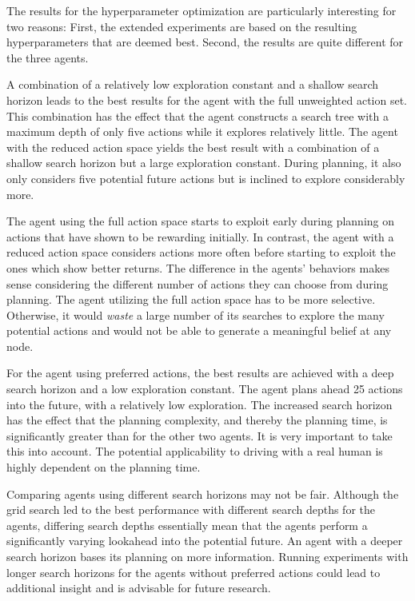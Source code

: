 The results for the hyperparameter optimization are particularly interesting for two reasons: First, the extended experiments are based on the resulting hyperparameters that are deemed best. Second, the results are quite different for the three agents. 

A combination of a relatively low exploration constant and a shallow search horizon leads to the best results for the agent with the full unweighted action set. This combination has the effect that the agent constructs a search tree with a maximum depth of only five actions while it explores relatively little. The agent with the reduced action space yields the best result with a combination of a shallow search horizon but a large exploration constant. During planning, it also only considers five potential future actions but is inclined to explore considerably more. 

The agent using the full action space starts to exploit early during planning on actions that have shown to be rewarding initially. In contrast, the agent with a reduced action space considers actions more often before starting to exploit the ones which show better returns. The difference in the agents' behaviors makes sense considering the different number of actions they can choose from during planning. The agent utilizing the full action space has to be more selective. Otherwise, it would \emph{waste} a large number of its searches to explore the many potential actions and would not be able to generate a meaningful belief at any node.

For the agent using preferred actions, the best results are achieved with a deep search horizon and a low exploration constant. The agent plans ahead 25 actions into the future, with a relatively low exploration. The increased search horizon has the effect that the planning complexity, and thereby the planning time, is significantly greater than for the other two agents. It is very important to take this into account. The potential applicability to driving with a real human is highly dependent on the planning time.

Comparing agents using different search horizons may not be fair. Although the grid search led to the best performance with different search depths for the agents, differing search depths essentially mean that the agents perform a significantly varying lookahead into the potential future. An agent with a deeper search horizon bases its planning on more information. Running experiments with longer search horizons for the agents without preferred actions could lead to additional insight and is advisable for future research. 


